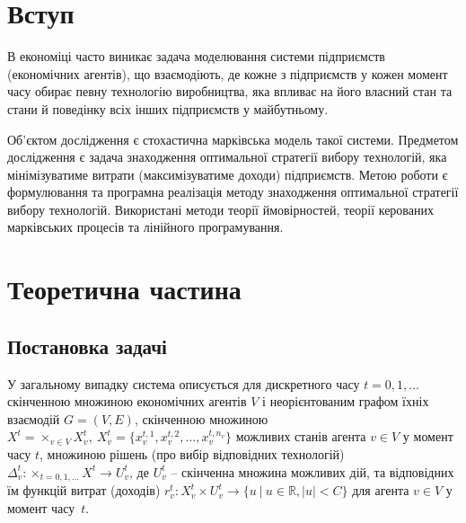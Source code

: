 \documentclass[oneside,14pt]{extarticle}
\begin{document}

\setcounter{page}{2}

\tableofcontents
\clearpage

\section{Вступ}

В економіці часто виникає\cite{David:1998} задача моделювання системи підприємств (економічних агентів), що взаємодіють, де кожне з підприємств у кожен момент часу обирає певну технологію виробництва, яка впливає на його власний стан та стани й поведінку всіх інших підприємств у майбутньому.

Об’єктом дослідження є стохастична марківська модель такої системи. Предметом дослідження є задача знаходження оптимальної стратегії вибору технологій, яка мінімізуватиме витрати (максимізуватиме доходи) підприємств. Метою роботи є формулювання та програмна реалізація методу знаходження оптимальної стратегії вибору технологій. Використані методи теорії ймовірностей, теорії керованих марківських процесів та лінійного програмування. 






\section{Теоретична частина}

\subsection{Постановка задачі}

\label{sec:description}

У загальному випадку система описується\cite{Chornei:2005} для дискретного часу \(t = 0, 1, \ldots \) скінченною множиною економічних агентів \(V\) і неорієнтованим графом їхніх взаємодій \(G = (V, E)\), скінченною множиною \(X^t = \times_{v \in V}X_v^t,\ X_v^t = \{x^{t,1}_v, x^{t,2}_v, \ldots, x^{t,n_v}_v\}\) можливих станів агента \(v \in V\) у момент часу \(t\), множиною рішень (про вибір відповідних технологій) \(\Delta_v^t: \times_{t=0,1,\ldots}X^t \rightarrow U_v^t\), де \(U_v^t\) – скінченна множина можливих дій, та відповідних їм функцій витрат (доходів) \(r_v^t: X_v^t \times U_v^t \rightarrow \{u\ |\ u \in \mathbb{R}, |u| < C\}\) для агента \(v \in V\) у момент часу~\(t\).
\end{document}
